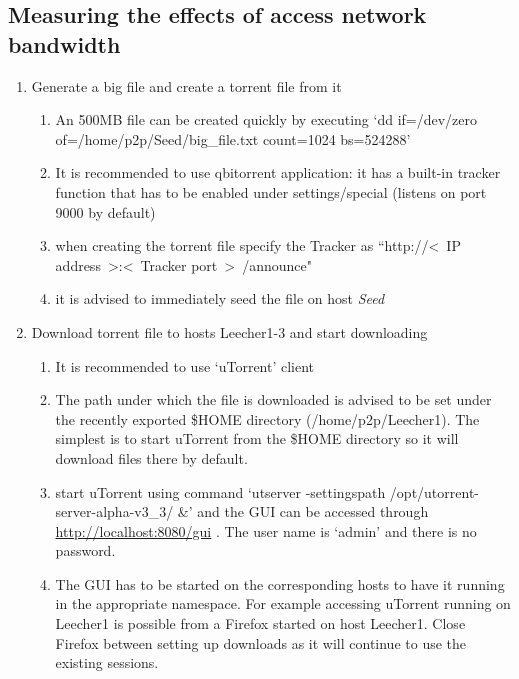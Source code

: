 \documentclass[a4paper]{article}
\begin{document}
\subsection{Measuring the effects of access network bandwidth}
\begin{enumerate}
    \item Generate a big file and create a torrent file from it
          \begin{enumerate}
              \item An 500MB file can be created quickly by executing `dd if=/dev/zero
                    of=/home/p2p/Seed/big\_file.txt count=1024 bs=524288'
              \item It is recommended to use qbitorrent application: it has a built-in tracker function that has to
                    be enabled under settings/special (listens on port 9000 by default)
              \item when creating the torrent file specify the Tracker as ``http://\textless~IP
                    address~\textgreater:\textless~Tracker port~\textgreater~/announce"
              \item it is advised to immediately seed the file on host \emph{Seed}
          \end{enumerate}
    \item  Download torrent file to hosts Leecher1-3 and start downloading
          \begin{enumerate}
              \item It is recommended to use `uTorrent' client
              \item The path under which the file is downloaded is advised to be set under the recently exported
                    \$HOME directory (/home/p2p/Leecher1). The simplest is to start uTorrent from the \$HOME directory so it will download
                    files there by default.
              \item start uTorrent using command `utserver -settingspath /opt/utorrent-server-alpha-v3\_3/ \&' and
                    the GUI can be accessed through \url{http://localhost:8080/gui} . The user name is `admin' and there is no password.
              \item The GUI has to be started on the corresponding hosts to have it running in the appropriate
                    namespace. For example accessing uTorrent running on Leecher1 is possible from a Firefox started on host Leecher1.
                    Close Firefox between setting up downloads as it will continue to use the existing sessions.

\end{enumerate}
\end{enumerate}
\end{document}
